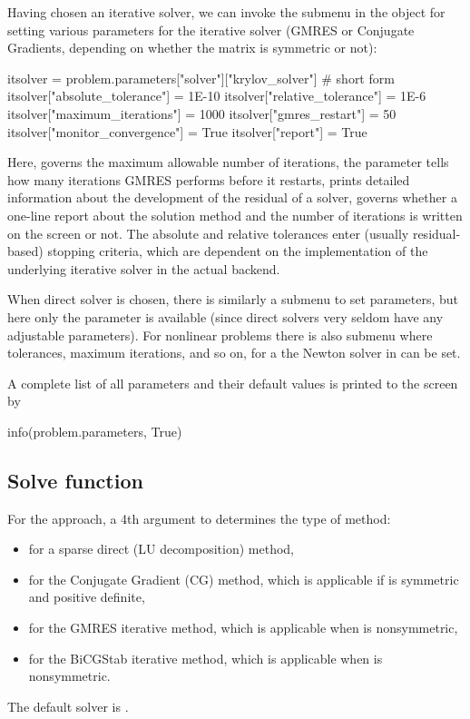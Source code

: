 Having chosen an iterative solver, we can invoke
the submenu 
in the
 object for setting various parameters for
the iterative solver (GMRES or Conjugate Gradients, depending on
whether the matrix is symmetric or not):
\begin{python}
itsolver = problem.parameters["solver"]["krylov_solver"] # short form
itsolver["absolute_tolerance"] = 1E-10
itsolver["relative_tolerance"] = 1E-6
itsolver["maximum_iterations"] = 1000
itsolver["gmres_restart"] = 50
itsolver["monitor_convergence"] = True
itsolver["report"] = True
\end{python}
Here,   governs the
maximum allowable number of iterations, the
 parameter tells how many
iterations GMRES performs before it restarts,
 prints detailed
information about the development of the residual of a solver,
 governs whether a one-line
report about the solution method and the number of iterations is
written on the screen or not. The absolute and relative tolerances
enter (usually residual-based) stopping criteria, which are dependent
on the implementation of the underlying iterative solver in the actual
backend.

When direct solver is chosen, there is similarly a submenu
 to set parameters, but here
only the  parameter is
available (since direct solvers very seldom have any adjustable
parameters). For nonlinear problems there is also submenu
 where tolerances,
maximum iterations, and so on, for a the Newton solver in
 can be set.

A complete list of all parameters and their default values
is printed to the screen by
\begin{python}
info(problem.parameters, True)
\end{python}

\subsection{Solve function}

For the  approach, a 4th argument to 
determines the type of method:
\begin{itemize}
\item {} for a sparse direct (LU decomposition) method,
\item {} for the Conjugate Gradient (CG) method, which is
applicable if  is symmetric and positive definite,
\item {} for
the GMRES iterative method, which is applicable when  is nonsymmetric,
\item {} for the BiCGStab iterative method, which is
  applicable when  is nonsymmetric.
\end{itemize}
The default solver is .

